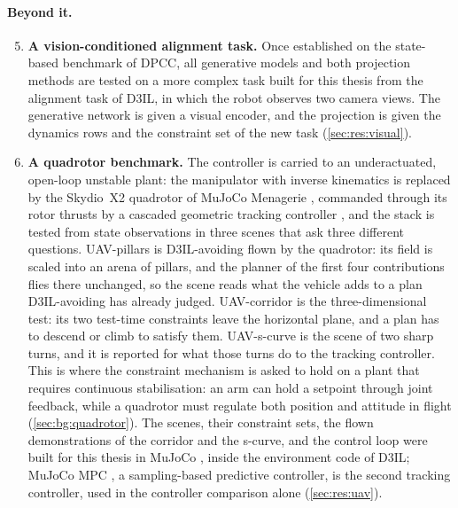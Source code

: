 \paragraph{Beyond it.}
\begin{enumerate}
  \setcounter{enumi}{4}
  \item \textbf{A vision-conditioned alignment task.} Once established on the state-based benchmark
    of \ac{DPCC}, all generative models and both projection methods are tested on a more complex
    task built for this thesis from the alignment task of D3IL, in which the robot observes two camera
    views. The generative network is given a visual encoder, and the projection is given the dynamics
    rows and the constraint set of the new task (\autoref{sec:res:visual}).
  \item \textbf{A quadrotor benchmark.} The controller is carried to an underactuated, open-loop
    unstable plant: the manipulator with inverse kinematics is replaced by the Skydio~X2 quadrotor of
    MuJoCo Menagerie \parencite{zakka2022menagerie}, commanded through its rotor thrusts by a cascaded
    geometric tracking controller \parencite{lee2010geometric}, and the stack is tested from state
    observations in three scenes that ask three different questions. UAV-pillars is
    D3IL-avoiding flown by the quadrotor: its field is scaled into an arena of pillars, and
    the planner of the first four contributions flies there unchanged, so the scene reads what the
    vehicle adds to a plan D3IL-avoiding has already judged. UAV-corridor is the three-dimensional test:
    its two test-time constraints leave the horizontal plane, and a plan has to descend or climb to
    satisfy them. UAV-s-curve is the scene of two sharp turns, and it is reported for what those turns
    do to the tracking controller. This is where the constraint mechanism is asked to hold on a plant
    that requires continuous stabilisation: an arm can hold a setpoint through joint feedback, while
    a quadrotor must regulate both position and attitude in flight
    (\autoref{sec:bg:quadrotor}). The scenes, their constraint sets, the flown demonstrations of the
    corridor and the s-curve, and the control loop were built for this thesis in MuJoCo
    \parencite{todorov2012mujoco}, inside the environment code of D3IL; MuJoCo MPC
    \parencite{howell2022predictive}, a sampling-based predictive controller, is the second tracking
    controller, used in the controller comparison alone (\autoref{sec:res:uav}).
\end{enumerate}

